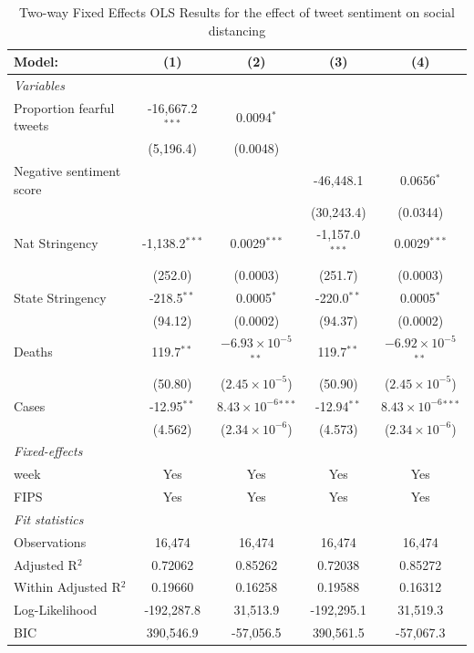 \documentclass[12pt,a4]{article}
\newcommand{\ra}[1]{\renewcommand{\arraystretch}{#1}}
\begin{document}
\begin{singlespace}
\centering
\begin{table}[!htb]
\caption{Two-way Fixed Effects OLS Results for the effect of tweet sentiment on social distancing}
\label{tab:mainspec}
\ra{0.6}
\begin{tabular}{lcccc}
  \tabularnewline\midrule\midrule
  Model:&(1) & (2) & (3) & (4)\\
  \midrule \emph{Variables}&   &   &   &  \\
  Proportion fearful tweets&-16,667.2$^{***}$ & 0.0094$^{*}$ &    &   \\
    &(5,196.4) & (0.0048) &    &   \\
  Negative sentiment score &   &    & -46,448.1 & 0.0656$^{*}$\\
    &   &    & (30,243.4) & (0.0344)\\
    Nat Stringency&-1,138.2$^{***}$ & 0.0029$^{***}$ & -1,157.0$^{***}$ & 0.0029$^{***}$\\
    &(252.0) & (0.0003) & (251.7) & (0.0003)\\
    State Stringency&-218.5$^{**}$ & 0.0005$^{*}$ & -220.0$^{**}$ & 0.0005$^{*}$\\
    &(94.12) & (0.0002) & (94.37) & (0.0002)\\
  Deaths&119.7$^{**}$ & $-6.93\times 10^{-5}$$^{**}$ & 119.7$^{**}$ & $-6.92\times 10^{-5}$$^{**}$\\
    &(50.80) & ($2.45\times 10^{-5}$) & (50.90) & ($2.45\times 10^{-5}$)\\
  Cases&-12.95$^{**}$ & $8.43\times 10^{-6}$$^{***}$ & -12.94$^{**}$ & $8.43\times 10^{-6}$$^{***}$\\
    &(4.562) & ($2.34\times 10^{-6}$) & (4.573) & ($2.34\times 10^{-6}$)\\
  \midrule \emph{Fixed-effects}&   &   &   &  \\
  week & Yes & Yes & Yes & Yes\\
  FIPS & Yes & Yes & Yes & Yes\\
  \midrule \emph{Fit statistics}&  & & & \\
  Observations & 16,474&16,474&16,474&16,474\\
  Adjusted R$^2$ & 0.72062&0.85262&0.72038&0.85272\\
Within Adjusted R$^2$ & 0.19660&0.16258&0.19588&0.16312\\
  Log-Likelihood & -192,287.8&31,513.9&-192,295.1&31,519.3\\
  BIC & 390,546.9&-57,056.5&390,561.5&-57,067.3\\

\end{tabular}
\end{table}
\end{singlespace}
\end{document}
